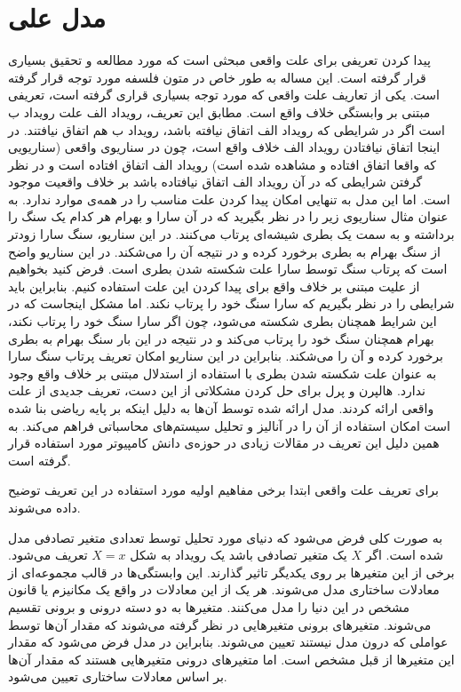 \section{مدل علی}
پیدا کردن تعریفی برای علت واقعی مبحثی است که مورد مطالعه و تحقیق بسیاری قرار گرفته است.
این مساله به طور خاص در متون فلسفه مورد توجه قرار گرفته است.
یکی از تعاریف علت واقعی که مورد توجه بسیاری قراری گرفته است، تعریفی مبتنی بر وابستگی خلاف واقع است.
مطابق این تعریف، رویداد الف علت رویداد ب است اگر در شرایطی که رویداد الف اتفاق نیافته باشد، رویداد ب هم اتفاق نیافتند.
در اینجا اتفاق نیافتادن رویداد الف خلاف واقع است، چون در سناریوی واقعی (سناریویی که واقعا اتفاق افتاده و مشاهده شده است)
رویداد الف اتفاق افتاده است و در نظر گرفتن شرایطی که در آن رویداد الف اتفاق نیافتاده باشد بر خلاف واقعیت موجود است.
اما این مدل به تنهایی امکان پیدا کردن علت مناسب را در همه‌ی موارد ندارد.
به عنوان مثال سناریوی زیر را در نظر بگیرید که در آن سارا و بهرام هر کدام یک سنگ را برداشته و به سمت یک بطری شیشه‌ای پرتاب می‌کنند.
در این سناریو، سنگ سارا زودتر از سنگ بهرام به بطری برخورد کرده و در نتیجه آن را می‌شکند.
در این سناریو واضح است که پرتاب سنگ توسط سارا علت شکسته شدن بطری است.
فرض کنید بخواهیم از علیت مبتنی بر خلاف واقع برای پیدا کردن این علت استفاده کنیم.
بنابراین باید شرایطی را در نظر بگیریم که سارا سنگ خود را پرتاب نکند.
اما مشکل اینجاست که در این شرایط همچنان بطری شکسته می‌شود، چون اگر سارا سنگ خود را پرتاب نکند، بهرام همچنان سنگ خود را پرتاب می‌کند و در نتیجه در این بار سنگ بهرام به بطری برخورد کرده و آن را می‌شکند.
بنابراین در این سناریو امکان تعریف پرتاب سنگ سارا به عنوان علت شکسته شدن بطری با استفاده از استدلال مبتنی بر خلاف واقع وجود ندارد.
هالپرن و پرل برای حل کردن مشکلاتی از این دست، تعریف جدیدی از علت واقعی ارائه کردند.
مدل ارائه شده توسط آن‌ها به دلیل اینکه بر پایه ریاضی بنا شده است امکان استفاده از آن را در آنالیز و تحلیل سیستم‌های محاسباتی فراهم می‌کند.
به همین دلیل این تعریف در مقالات زیادی در حوزه‌ی دانش کامپیوتر مورد استفاده قرار گرفته است.

برای تعریف علت واقعی ابتدا برخی مفاهیم اولیه مورد استفاده در این تعریف توضیح داده می‌شوند.

به صورت کلی فرض می‌شود که دنیای مورد تحلیل توسط تعدادی متغیر تصادفی مدل شده است.
اگر
$X$
یک متغیر تصادفی باشد یک رویداد به شکل
$X=x$
تعریف می‌شود.
برخی از این متغیر‌ها بر روی یکدیگر تاثیر گذارند.
این وابستگی‌ها در قالب مجموعه‌ای از معادلات ساختاری مدل می‌شوند.
هر یک از این معادلات در واقع یک مکانیزم یا قانون مشخص در این دنیا را مدل می‌کنند.
متغیرها به دو دسته درونی و برونی تقسیم می‌شوند.
متغیر‌های برونی متغیر‌هایی در نظر گرفته می‌شوند که مقدار آن‌ها توسط عواملی که درون مدل نیستند تعیین می‌شوند.
بنابراین در مدل فرض می‌شود که مقدار این متغیر‌ها از قبل مشخص است.
اما متغیر‌های درونی متغیرهایی هستند که مقدار آن‌ها بر اساس معادلات ساختاری تعیین می‌شود.

